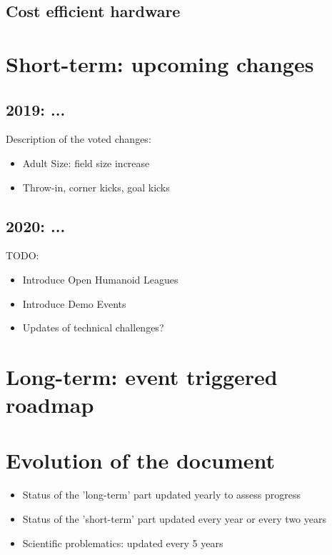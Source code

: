 \documentclass{article}
\begin{document}
\subsection{Cost efficient hardware}

\section{\label{sec:ShortTerm}Short-term: upcoming changes}

\subsection{2019: ...}

Description of the voted changes:
\begin{itemize}
\item Adult Size: field size increase
\item Throw-in, corner kicks, goal kicks
\end{itemize}

\subsection{2020: ...}

TODO: 
\begin{itemize}
\item Introduce Open Humanoid Leagues
\item Introduce Demo Events
\item Updates of technical challenges?
\end{itemize}

\section{\label{sec:LongTerm}Long-term: event triggered roadmap}
\begin{sidewaysfigure}

\end{sidewaysfigure}

\section{Evolution of the document}

\begin{itemize}
\item Status of the 'long-term' part updated yearly to assess progress
\item Status of the 'short-term' part updated every year or every two years
\item Scientific problematics: updated every 5 years
\end{itemize}

\end{document}

